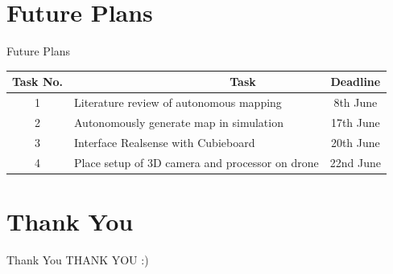 \documentclass[10pt, a4paper]{beamer}
\begin{document}
\section{Future Plans}
\begin{frame}{Future Plans}
\begin{tabular}{| c | p{6.5cm} | c | }
\hline
Task No. & ~~~~~~~~~~~~~~~~~~~~~~~~Task & Deadline\\
\hline
1 & Literature review of autonomous mapping & 8th June\\
\hline
2 & Autonomously generate map in simulation & 17th June\\
\hline
3 & Interface Realsense with Cubieboard & 20th June\\
\hline
4 & Place setup of 3D camera and processor on drone & 22nd June\\
\hline
\end{tabular}
\end{frame}


\section{Thank You}
\begin{frame}{Thank You}
	\centering THANK YOU :)
\end{frame}
\end{document}
